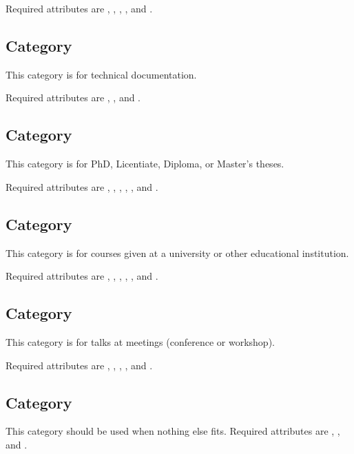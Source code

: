 Required attributes are , , ,
, and .

\subsection{Category }

This category is for technical documentation.

Required attributes are , , and .

\subsection{Category }

This category is for PhD, Licentiate, Diploma, or Master's theses.

Required attributes are , , ,
, , and .

\subsection{Category }

This category is for courses given at a university or other
educational institution.

Required attributes are , , ,
, , and .

\subsection{Category }

This category is for talks at meetings (conference or workshop).

Required attributes are , , , , and .

\subsection{Category }

This category should be used when nothing else fits. Required attributes are
, , and .
